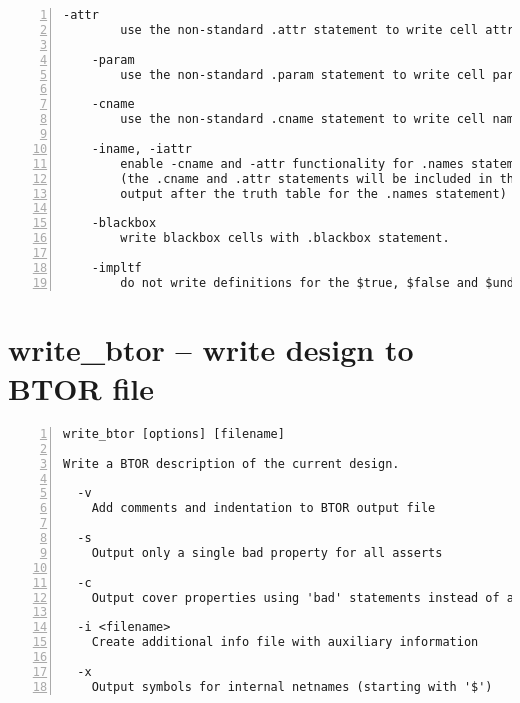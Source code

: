 \begin{lstlisting}[numbers=left,frame=single]
    -attr
        use the non-standard .attr statement to write cell attributes

    -param
        use the non-standard .param statement to write cell parameters

    -cname
        use the non-standard .cname statement to write cell names

    -iname, -iattr
        enable -cname and -attr functionality for .names statements
        (the .cname and .attr statements will be included in the BLIF
        output after the truth table for the .names statement)

    -blackbox
        write blackbox cells with .blackbox statement.

    -impltf
        do not write definitions for the $true, $false and $undef wires.
\end{lstlisting}

\section{write\_btor -- write design to BTOR file}
\label{cmd:write_btor}
\begin{lstlisting}[numbers=left,frame=single]
    write_btor [options] [filename]

Write a BTOR description of the current design.

  -v
    Add comments and indentation to BTOR output file

  -s
    Output only a single bad property for all asserts

  -c
    Output cover properties using 'bad' statements instead of asserts

  -i <filename>
    Create additional info file with auxiliary information

  -x
    Output symbols for internal netnames (starting with '$')
\end{lstlisting}

